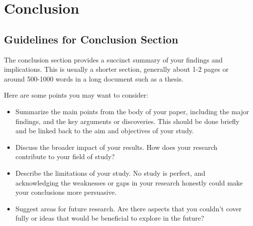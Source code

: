\chapter{Conclusion}

\section*{Guidelines for Conclusion Section}
The conclusion section provides a succinct summary of your findings and implications. This is usually a shorter section, generally about 1-2 pages or around 500-1000 words in a long document such as a thesis. 

Here are some points you may want to consider:
\begin{itemize}
    \item Summarize the main points from the body of your paper, including the major findings, and the key arguments or discoveries. This should be done briefly and be linked back to the aim and objectives of your study.
    \item Discuss the broader impact of your results. How does your research contribute to your field of study? 
    \item Describe the limitations of your study. No study is perfect, and acknowledging the weaknesses or gaps in your research honestly could make your conclusions more persuasive.
    \item Suggest areas for future research. Are there aspects that you couldn't cover fully or ideas that would be beneficial to explore in the future?
\end{itemize}